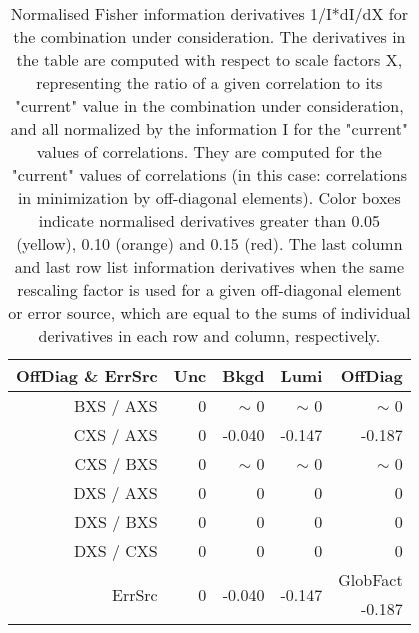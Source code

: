 \begin{table}[H]
\scriptsize
\begin{center}
\renewcommand{\arraystretch}{1.1}
\begin{tabular}{|r|rrr|r|}
\hline
 OffDiag \& ErrSrc & {\tiny Unc} & {\tiny Bkgd} & {\tiny Lumi} & OffDiag\\
\hline
BXS / AXS &  0 &  {\tiny $\sim$ }0 &  {\tiny $\sim$ }0 &  {\tiny $\sim$ }0 \\
CXS / AXS &  0 &     -0.040 &     -0.147 &     -0.187 \\
CXS / BXS &  0 &  {\tiny $\sim$ }0 &  {\tiny $\sim$ }0 &  {\tiny $\sim$ }0 \\
DXS / AXS &  0 &  0 &  0 &  0 \\
DXS / BXS &  0 &  0 &  0 &  0 \\
DXS / CXS &  0 &  0 &  0 &  0 \\
\hline
\multirow{2}{*}{ErrSrc} & \multirow{2}{*}{ 0} & \multirow{2}{*}{    -0.040} & \multirow{2}{*}{    -0.147} & GlobFact\\
 & & & &     -0.187 \\
\hline
\end{tabular}
\renewcommand{\arraystretch}{1}
\caption{Normalised Fisher information derivatives 1/I*dI/dX for the combination under consideration. The derivatives in the table are computed with respect to scale factors X, representing the ratio of a given correlation to its "current" value in the combination under consideration, and all normalized by the information I for the "current" values of correlations. They are computed for the "current" values of correlations (in this case: correlations in minimization by off-diagonal elements). Color boxes indicate normalised derivatives greater than 0.05 (yellow), 0.10 (orange) and 0.15 (red). The last column and last row list information derivatives when the same rescaling factor is used for a given off-diagonal element or error source, which are equal to the sums of individual derivatives in each row and column, respectively.}
\end{center}
\end{table}
